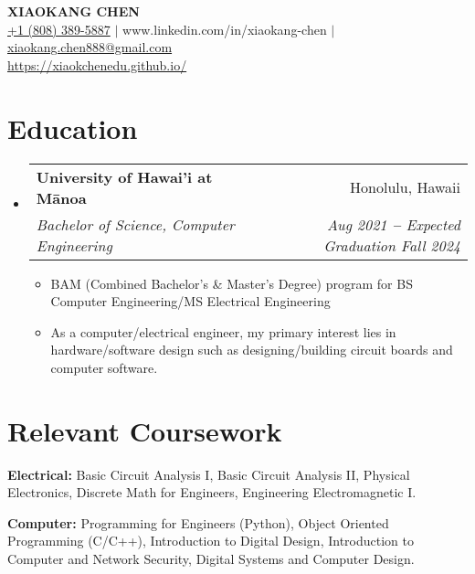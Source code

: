 \documentclass[letterpaper,11pt]{article}
\makeatletter
\newcommand{\resumeItem}[1]{
  \item\small{
    {#1 \vspace{-2pt}}
  }
}
\newcommand{\resumeSubheading}[4]{
  \vspace{-2pt}\item
    \begin{tabular*}{0.97\textwidth}[t]{l@{\extracolsep{\fill}}r}
      \textbf{#1} & #2 \\
      \textit{\small#3} & \textit{\small #4} \\
    \end{tabular*}\vspace{-7pt}
}
\newcommand{\resumeSubHeadingListStart}{\begin{itemize}[leftmargin=0.15in, label={}]}
\newcommand{\resumeSubHeadingListEnd}{\end{itemize}}
\newcommand{\resumeItemListStart}{\begin{itemize}}
\newcommand{\resumeItemListEnd}{\end{itemize}\vspace{-5pt}}
\makeatother
\begin{document}

\begin{center}
    \textbf{\Huge \scshape XIAOKANG CHEN} \\ \vspace{3pt}
    \small
    \hspace{.5pt} \href{tel:18083895887}{+1 (808) 389-5887}\hspace{.5pt} $|$\hspace{.5pt} {www.linkedin.com/in/xiaokang-chen}\hspace{.5pt} $|$\hspace{.5pt} \href{mailto:xiaokang.chen888@gmail.com}{xiaokang.chen888@gmail.com} \\
    \hspace{.5pt} \href{https://xiaokchenedu.github.io/}{https://xiaokchenedu.github.io/} \\
\end{center}


\section{Education}
  \vspace{3pt}
  \resumeSubHeadingListStart
    
  \resumeSubheading
      {University of Hawai'i at Mānoa}{Honolulu, Hawaii}
    {Bachelor of Science, Computer Engineering}{Aug 2021 \textbf{--} Expected Graduation Fall 2024}
    \resumeItemListStart
      \resumeItem{BAM (Combined Bachelor's \& Master's Degree) program for BS Computer Engineering/MS Electrical Engineering}
      \resumeItem{As a computer/electrical engineer, my primary interest lies in hardware/software design such as designing/building circuit boards and computer software.}
    \resumeItemListEnd
    
  \resumeSubHeadingListEnd


\section{Relevant Coursework}
  \vspace{2pt}
  \resumeSubHeadingListStart
    \small{\item{
        \textbf{Electrical: }{Basic Circuit Analysis I, Basic Circuit Analysis II, Physical Electronics, Discrete Math for Engineers, Engineering Electromagnetic I.} \\ \vspace{3pt}
        
        \textbf{Computer: }{Programming for Engineers (Python), Object Oriented Programming (C/C++), Introduction to Digital Design, Introduction to Computer and Network Security, Digital Systems and Computer Design.}
    }}
  \resumeSubHeadingListEnd
\end{document}
